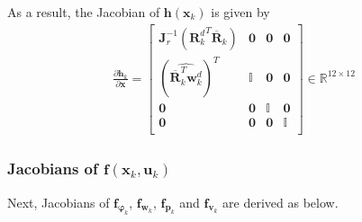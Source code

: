 As a result, the Jacobian of $\mathbf{h}(\mathbf{x}_k)$ is given by
\begin{align}
\label{eq:dh_dx}
\frac{\partial \mathbf{h}_k}{\partial \mathbf{x}} =
\left[ {\begin{array}{cccc}
	\mathbf{J}_{r}^{-1}({\mathbf{R}_k^d}^T \overline{\mathbf{R}}_{k}) & \mathbf{0} & \mathbf{0} & \mathbf{0}  \\[1mm]
	(\widehat{\overline{\mathbf{R}}_{k}^{T} \mathbf{w}_{k}^{d}} )^{T} & \mathbb{I} & \mathbf{0} & \mathbf{0}  \\[1mm]
	\mathbf{0} & \mathbf{0} & \mathbb{I} & \mathbf{0}  \\[1mm]
	\mathbf{0} & \mathbf{0} & \mathbf{0} & \mathbb{I}  \\[1mm]
	\end{array} } \right] \in \mathbb{R}^{12 \times 12}
\end{align}
\newline 

\subsubsection{Jacobians of $\mathbf{f}(\mathbf{x}_k,\mathbf{u}_k)$}
Next, Jacobians of $\mathbf{f}_{\boldsymbol{\varphi}_{k}}$, $\mathbf{f}_{\mathbf{w}_{k}}$, $\mathbf{f}_{\mathbf{p}_{k}}$ and $\mathbf{f}_{\mathbf{v}_{k}}$ are derived as below.\\

